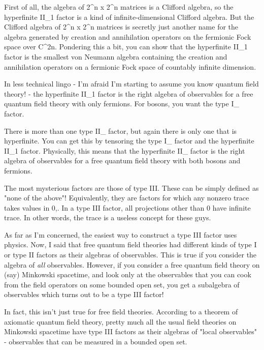 First of all, the algebra of 2^{n} x 2^{n} matrices is a
Clifford algebra, so the hyperfinite II_{1} factor is a kind of
infinite-dimensional Clifford algebra.  But the Clifford algebra of
2^{n} x 2^{n} matrices is secretly just another name for
the algebra generated by creation and annihilation operators on the
fermionic Fock space over C^{2n}.  Pondering this a bit, you can show
that the hyperfinite II_{1} factor is the smallest von Neumann
algebra containing the creation and annihilation operators on a
fermionic Fock space of countably infinite dimension.

In less technical lingo - I'm afraid I'm starting to assume you know
quantum field theory! - the hyperfinite II_{1} factor is the
right algebra of observables for a free quantum field theory with only
fermions.  For bosons, you want the type I_{\infty } factor.

There is more than one type II_{\infty } factor, but again
there is only one that is hyperfinite.  You can get this by tensoring
the type I_{\infty } factor and the hyperfinite II_{1}
factor.  Physically, this means that the hyperfinite
II_{\infty } factor is the right algebra of observables for a
free quantum field theory with both bosons and fermions.

The most mysterious factors are those of type III.  These can be simply
defined as "none of the above"!  Equivalently, they are factors for 
which any nonzero trace takes values in {0,\infty }.  In a type III
factor, all projections other than 0 have infinite trace.  In other
words, the trace is a useless concept for these guys.  

As far as I'm concerned, the easiest way to construct a type III factor
uses physics.  Now, I said that free quantum field theories had
different kinds of type I or type II factors as their algebras of
observables.  This is true if you consider the algebra of \emph{all}
observables. However, if you consider a free quantum field theory on
(say) Minkowski spacetime, and look only at the observables that you can
cook from the field operators on some bounded open set, you get a
subalgebra of observables which turns out to be a type III factor!  

In fact, this isn't just true for free field theories.  According to a
theorem of axiomatic quantum field theory, pretty much all the usual
field theories on Minkowski spacetime have type III factors as their
algebras of "local observables" - observables that can be measured in
a bounded open set.  

